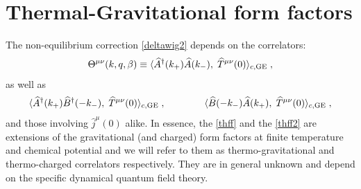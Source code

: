 \documentclass[prd,superscriptaddress,nofootinbib,notitlepage]{revtex4-1}
\def\wT{{\widehat T}}
\def\wj{{\widehat j}}
\def\wA{{\widehat A}}
\def\wB{{\widehat B}}
\def\wA{\widehat A}
\def\wAd{\widehat A^{\dagger}}
\def\wB{\widehat B}
\def\wBd{\widehat B^{\dagger}}
\newcommand{\be}{\begin{equation}}
\newcommand{\ee}{\end{equation}}
\begin{document}
\section{Thermal-Gravitational form factors}
\label{formfactors}

The non-equilibrium correction \eqref{deltawig2} depends on the correlators:
%
\be\label{thff}
\Theta^{\mu\nu}(k,q,\beta) \equiv \langle\wAd(k_+)\wA(k_-),\;\wT^{\mu\nu}(0)\rangle_{c,{\rm GE}} \;,
\ee
%
as well as 
%
\be\label{thff2}
\langle\wAd(k_+)\wBd(-k_-),\;\wT^{\mu\nu}(0) \rangle_{c,{\rm GE}}\;, 
\qquad \qquad \langle\wB(-k_-)\wA(k_+),\;\wT^{\mu\nu}(0)\rangle_{c,{\rm GE}}\;,
\ee
%
and those involving $\wj^\mu(0)$ alike. In essence, the \eqref{thff} and the \eqref{thff2} are extensions of the gravitational 
(and charged) form factors at finite temperature and chemical potential and we will refer to them as thermo-gravitational 
and thermo-charged correlators respectively. They are in general unknown and depend on the specific dynamical 
quantum field theory. 
\end{document}
